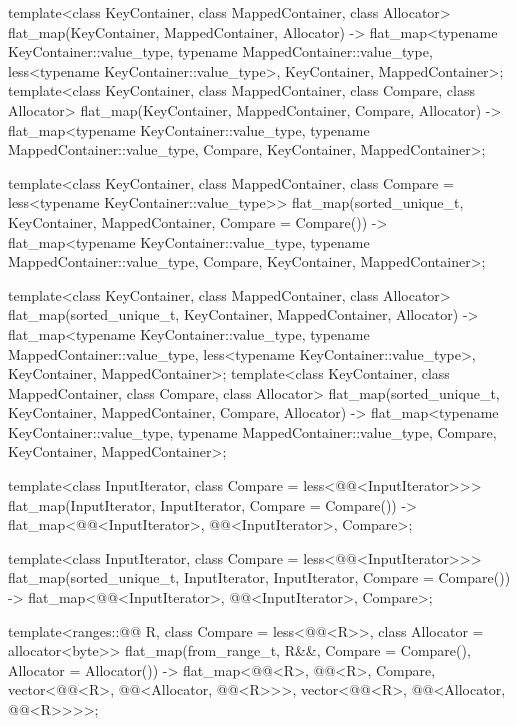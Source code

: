\begin{codeblock}
{  template<class KeyContainer, class MappedContainer, class Allocator>
    flat_map(KeyContainer, MappedContainer, Allocator)
      -> flat_map<typename KeyContainer::value_type, typename MappedContainer::value_type,
                  less<typename KeyContainer::value_type>, KeyContainer, MappedContainer>;
  template<class KeyContainer, class MappedContainer, class Compare, class Allocator>
    flat_map(KeyContainer, MappedContainer, Compare, Allocator)
      -> flat_map<typename KeyContainer::value_type, typename MappedContainer::value_type,
                  Compare, KeyContainer, MappedContainer>;

  template<class KeyContainer, class MappedContainer,
           class Compare = less<typename KeyContainer::value_type>>
    flat_map(sorted_unique_t, KeyContainer, MappedContainer, Compare = Compare())
      -> flat_map<typename KeyContainer::value_type, typename MappedContainer::value_type,
                  Compare, KeyContainer, MappedContainer>;

  template<class KeyContainer, class MappedContainer, class Allocator>
    flat_map(sorted_unique_t, KeyContainer, MappedContainer, Allocator)
      -> flat_map<typename KeyContainer::value_type, typename MappedContainer::value_type,
                  less<typename KeyContainer::value_type>, KeyContainer, MappedContainer>;
  template<class KeyContainer, class MappedContainer, class Compare, class Allocator>
    flat_map(sorted_unique_t, KeyContainer, MappedContainer, Compare, Allocator)
      -> flat_map<typename KeyContainer::value_type, typename MappedContainer::value_type,
                  Compare, KeyContainer, MappedContainer>;

  template<class InputIterator, class Compare = less<@@<InputIterator>>>
    flat_map(InputIterator, InputIterator, Compare = Compare())
      -> flat_map<@@<InputIterator>, @@<InputIterator>, Compare>;

  template<class InputIterator, class Compare = less<@@<InputIterator>>>
    flat_map(sorted_unique_t, InputIterator, InputIterator, Compare = Compare())
      -> flat_map<@@<InputIterator>, @@<InputIterator>, Compare>;

  template<ranges::@@ R, class Compare = less<@@<R>>,
           class Allocator = allocator<byte>>
    flat_map(from_range_t, R&&, Compare = Compare(), Allocator = Allocator())
      -> flat_map<@@<R>, @@<R>, Compare,
                  vector<@@<R>, @@<Allocator, @@<R>>>,
                  vector<@@<R>, @@<Allocator, @@<R>>>>;

}
\end{codeblock}
